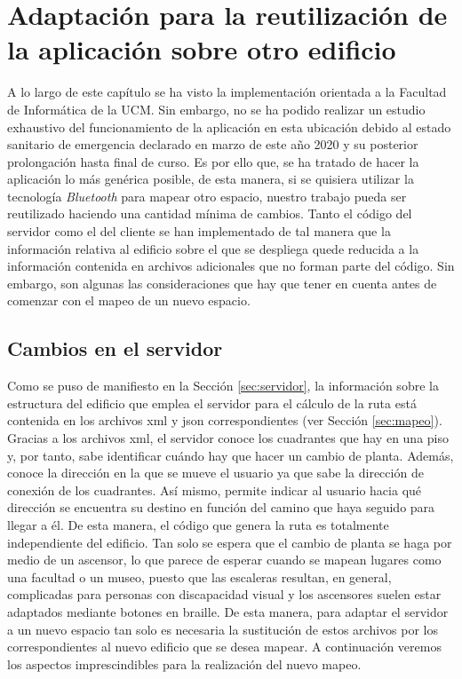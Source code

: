 \section{Adaptación para la reutilización de la aplicación sobre otro edificio}
\label{sec:adaptacion}

A lo largo de este capítulo se ha visto la implementación orientada a la Facultad de Informática de la UCM. Sin embargo, no se ha podido realizar un estudio exhaustivo del funcionamiento de la aplicación en esta ubicación debido al estado sanitario de emergencia declarado en marzo de este año 2020 y su posterior prolongación hasta final de curso. Es por ello que, se ha tratado de hacer la aplicación lo más genérica posible, de esta manera, si se quisiera utilizar la tecnología \textit{Bluetooth} para mapear otro espacio, nuestro trabajo pueda ser reutilizado haciendo una cantidad mínima de cambios. Tanto el código del servidor como el del cliente se han implementado de tal manera que la información relativa al edificio sobre el que se despliega quede reducida a la información contenida en archivos adicionales que no forman parte del código. Sin embargo, son algunas las consideraciones que hay que tener en cuenta antes de comenzar con el mapeo de un nuevo espacio. 



\subsection{Cambios en el servidor}
\label{sub:cambiosServidor}

Como se puso de manifiesto en la Sección \ref{sec:servidor}, la información sobre la estructura del edificio que emplea el servidor para el cálculo de la ruta está contenida en los archivos xml y json correspondientes (ver Sección \ref{sec:mapeo}). Gracias a los archivos xml, el servidor conoce los cuadrantes que hay en una piso y, por tanto, sabe identificar cuándo hay que hacer un cambio de planta. Además, conoce la dirección en la que se mueve el usuario ya que sabe la dirección de conexión de los cuadrantes. Así mismo, permite indicar al usuario hacia qué dirección se encuentra su destino en función del camino que haya seguido para llegar a él. De esta manera, el código que genera la ruta es totalmente independiente del edificio. Tan solo se espera que el cambio de planta se haga por medio de un ascensor, lo que parece de esperar cuando se mapean lugares como una facultad o un museo, puesto que las escaleras resultan, en general, complicadas para personas con discapacidad visual y los ascensores suelen estar adaptados mediante botones en braille. De esta manera, para adaptar el servidor a un nuevo espacio tan solo es necesaria la sustitución de estos archivos por los correspondientes al nuevo edificio que se desea mapear. A continuación veremos los aspectos imprescindibles para la realización del nuevo mapeo.


